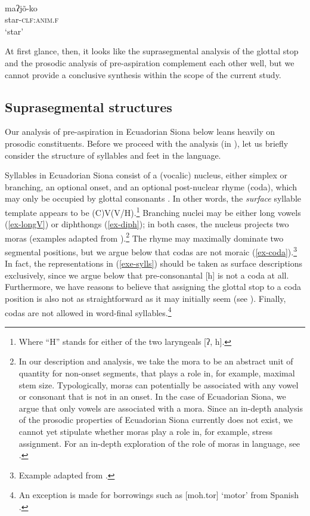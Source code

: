 \documentclass[output=paper]{langscibook}
\begin{document}
\begin{exe}
\begin{xlist}
	\ex \glll [mãʔ.ɲõ.ko]\\
	maʔjõ-ko\\
	star-\textsc{clf:anim.f}\\
	\trans `star'\\
	{\citep[20120919elicr005]{Bruil:2012}}
	\z
\end{xlist}
\end{exe}

At first glance, then, it looks like the suprasegmental analysis of the glottal stop and the prosodic analysis of pre-aspiration complement each other well, but we cannot provide a conclusive synthesis within the scope of the current study.





\subsection{Suprasegmental structures}\label{sec-supra}
Our analysis of pre-aspiration in Ecuadorian Siona below leans heavily on prosodic constituents. Before we proceed with the analysis (in ), let us briefly consider the structure of syllables and feet in the language.

Syllables in Ecuadorian Siona consist of a (vocalic) nucleus, either simplex or branching, an optional onset, and an optional post-nuclear rhyme (coda), which may only be occupied by glottal consonants \citep[83--84]{Bruil:2014}. In other words, the \emph{surface} syllable template appears to be (C)V(V/H).\footnote{Where ``H'' stands for either of the two laryngeals [ʔ, h].} Branching nuclei may be either long vowels (\ref{ex-longV}) or diphthongs (\ref{ex-diph}); in both cases, the nucleus projects two moras (examples adapted from \citealt[84--85]{Bruil:2014}).\footnote{In our description and analysis, we take the mora to be an abstract unit of quantity for non-onset segments, that plays a role in, for example, maximal stem size. Typologically, moras can potentially be associated with any vowel or consonant that is not in an onset. In the case of Ecuadorian Siona, we argue that only vowels are associated with a mora. Since an in-depth analysis of the prosodic properties of Ecuadorian Siona currently does not exist, we cannot yet stipulate whether moras play a role in, for example, stress assignment. For an in-depth exploration of the role of moras in language, see \citet{Hayes:1989, Hayes:1995}.} The rhyme may maximally dominate two segmental positions, but we argue below that codas are not moraic (\ref{ex-coda}).\footnote{Example adapted from \citet[149]{Bruil:2014}.} In fact, the representations in (\ref{exe-sylls}) should be taken as surface descriptions exclusively, since we argue below that pre-consonantal [h] is not a coda at all. Furthermore, we have reasons to believe that assigning the glottal stop to a coda position is also not as straightforward as it may initially seem (see ). Finally, codas are not allowed in word-final syllables.\footnote{An exception is made for borrowings such as [moh.tor] `motor' from Spanish \citep[84]{Bruil:2014}.}
\end{document}

